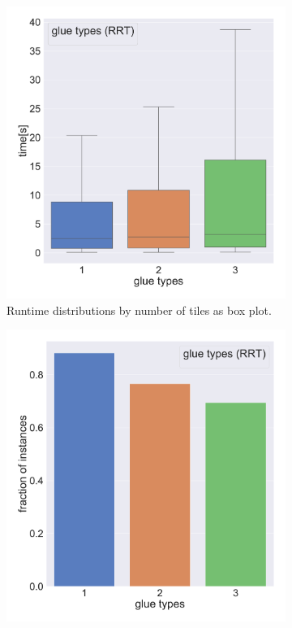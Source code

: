 \begin{figure}[htpb]
\centering
\begin{subfigure}[b]{0.48\textwidth}
\centering
\includegraphics[width=\textwidth]{figures/plots/heuristic_solvers_i1/rrt_i1_time_over_glue_types.pdf}
\caption{Runtime distributions by number of tiles as box plot.}
\label{fig:rrt_i1_time_over_glue_types}
\end{subfigure}
\hfill
\begin{subfigure}[b]{0.48\textwidth}
\centering
\includegraphics[width=\textwidth]{figures/plots/heuristic_solvers_i1/rrt_i1_fraction_solved_over_glue_types.pdf}

\end{subfigure}
\end{figure}
